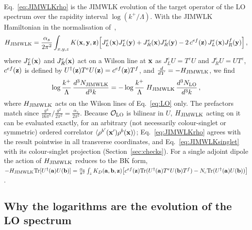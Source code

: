 Eq.~\eqref{eq:JIMWLKrho} is the JIMWLK evolution of the target operator of the LO spectrum over the rapidity interval $\log(k^+/\Lambda)$. With the JIMWLK Hamiltonian in the normalisation of~\cite{Lublinsky:2016meo},
\begin{align}\label{eq:HJIMWLK}
H_{\rm JIMWLK}=\frac{\alpha_s}{2\pi^2}\int_{x,y,z}K(\mathbf{x},\mathbf{y},\mathbf{z})\Big[J_L^e(\mathbf{x})J_L^e(\mathbf{y})+J_R^e(\mathbf{x})J_R^e(\mathbf{y})-2\,c^{ef}(\mathbf{z})\,J_L^e(\mathbf{x})J_R^f(\mathbf{y})\Big]\,,
\end{align}
where $J_L^e(\mathbf{x})$ and $J_R^e(\mathbf{x})$ act on a Wilson line at $\mathbf{x}$ as $J_L^eU=T^eU$ and $J_R^eU=UT^e$, $c^{ef}(\mathbf{z})$ is defined by $U^\dagger(\mathbf{z})T^eU(\mathbf{z})=c^{ef}(\mathbf{z})T^f$, and $\frac{d}{dY}=-H_{\rm JIMWLK}$, we find
\begin{align}\label{eq:JIMWLKasLO}
\log\frac{k^+}{\Lambda}\,\frac{d^3N_{\rm JIMWLK}}{d^3k}=-\log\frac{k^+}{\Lambda}\;H_{\rm JIMWLK}\,\frac{d^3N_{\rm LO}}{d^3k}\,,
\end{align}
where $H_{\rm JIMWLK}$ acts on the Wilson lines of Eq.~\eqref{eq:LO} only. The prefactors match since $\frac{g^4}{16\pi^5}\big/\frac{g^2}{2\pi^2}=\frac{\alpha_s}{2\pi^2}$. Because $\mathcal O_{\rm LO}$ is bilinear in $U$, $H_{\rm JIMWLK}$ acting on it can be evaluated exactly, for an arbitrary (not necessarily colour-singlet or symmetric) ordered correlator $\langle\rho^{b'}(\mathbf{x}')\rho^b(\mathbf{x})\rangle$; Eq.~\eqref{eq:JIMWLKrho} agrees with the result pointwise in all transverse coordinates, and Eq.~\eqref{eq:JIMWLKsinglet} with its colour-singlet projection (Section~\ref{sec:checks}). For a single adjoint dipole the action of $H_{\rm JIMWLK}$ reduces to the BK form, $-H_{\rm JIMWLK}{\rm Tr}[U^\dagger(\mathbf{a})U(\mathbf{b})]=\frac{\alpha_s}{\pi^2}\int_zK_D(\mathbf{a},\mathbf{b},\mathbf{z})\big[c^{ef}(\mathbf{z}){\rm Tr}(U^\dagger(\mathbf{a})T^eU(\mathbf{b})T^f)-N_c{\rm Tr}(U^\dagger(\mathbf{a})U(\mathbf{b}))\big]$.

\subsection{Why the logarithms are the evolution of the LO spectrum}\label{sec:proofsketch}

